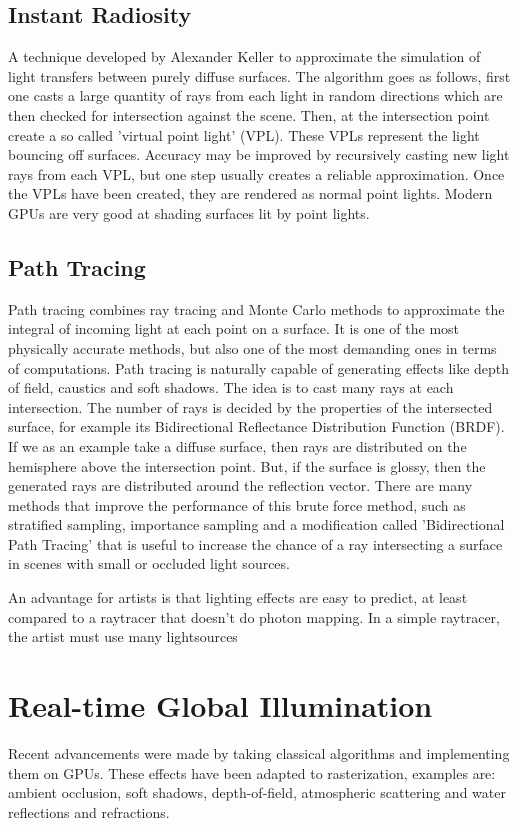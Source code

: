 	\subsection {Instant Radiosity}
		A technique developed by Alexander Keller to approximate the simulation of light
		transfers between purely diffuse surfaces. The algorithm goes as follows, first
		one casts a large quantity of rays from each light in random directions which
		are then checked for intersection against the scene. Then, at the intersection
		point create a so called 'virtual point light' (VPL). These VPLs represent the
		light bouncing off surfaces. Accuracy may be improved by recursively casting new
		light rays from each VPL, but one step usually creates a reliable approximation.
		Once the VPLs have been created, they are rendered as normal point lights.
		Modern GPUs are very good at shading surfaces lit by point lights.

	\subsection {Path Tracing}
		Path tracing combines ray tracing and Monte Carlo methods to approximate the
		integral of incoming light at each point on a surface. It is one of the most physically
		accurate methods, but also one of the most demanding ones in terms of
		computations. Path tracing is naturally capable of generating effects like depth
		of field, caustics and soft shadows. The idea is to cast many rays at each
		intersection. The number of rays is decided by the properties of the intersected
		surface, for example its Bidirectional Reflectance Distribution Function (BRDF). 
		If we as an example take a diffuse surface, then rays are distributed on the hemisphere 
		above the intersection point. But, if the surface is glossy, then the generated 
		rays are distributed around the reflection vector. 
		There are many methods that improve the performance of this brute force
		method, such as stratified sampling, importance sampling and a modification
		called 'Bidirectional Path Tracing' that is useful to increase the chance of a
		ray intersecting a surface in scenes with small or occluded light sources.
		
		An advantage for artists is that lighting effects are easy to predict, at least compared to a raytracer that doesn't do photon mapping. In a simple raytracer, the artist must use many lightsources 

	\section {Real-time Global Illumination}  
		Recent advancements were made by taking classical algorithms and implementing them on GPUs. 
		These effects have been adapted to rasterization, examples are: ambient occlusion, soft shadows,
		depth-of-field, atmospheric scattering and water reflections and refractions.

